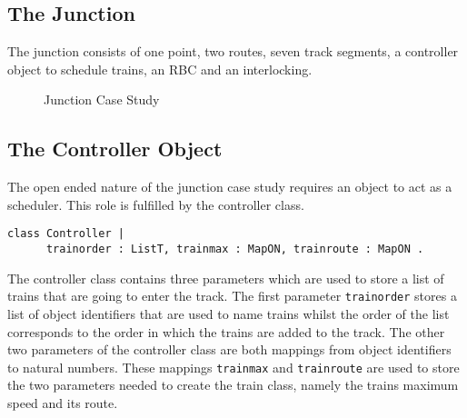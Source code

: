 \subsection*{The Junction}
The junction consists of one point, two routes, seven track segments, a controller object to schedule trains, an RBC and an interlocking.

\begin{figure}[h!]
\begin{center}
\end{center} 
\caption{Junction Case Study}
\label{fig:junctionexample}
\end{figure}

\subsection*{The Controller Object}
The open ended nature of the junction case study requires an object to act as a scheduler. This role is fulfilled by the controller class. 

\begin{lstlisting}[caption = "Controller Class"]
class Controller | 
      trainorder : ListT, trainmax : MapON, trainroute : MapON .
\end{lstlisting}

The controller class contains three parameters which are used to store a list of trains that are going to enter the track. The first parameter \texttt{trainorder} stores a list of object identifiers that are used to name trains whilst the order of the list corresponds to the order in which the trains are added to the track. The other two parameters of the controller class are both mappings from object identifiers to natural numbers. These mappings \texttt{trainmax} and \texttt{trainroute} are used to store the two parameters needed to create the train class, namely the trains maximum speed and its route.

